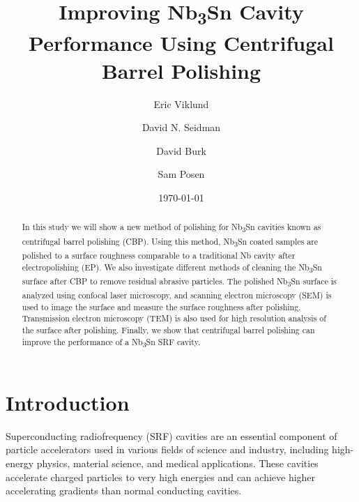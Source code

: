\documentclass[reprint,amsmath,amssymb,aps]{revtex4-2}%
\begin{document}
%
\normalsize%
\title{Improving Nb\textsubscript{3}Sn Cavity Performance Using Centrifugal Barrel Polishing}%
\author{Eric Viklund}%
%
%
\author{David N. Seidman}%
%
\author{David Burk}%
%
\author{Sam Posen}%
%
\date{\today}%

\begin{abstract}%
In this study we will show a new method of polishing for Nb\textsubscript{3}Sn cavities known as centrifugal barrel polishing (CBP). Using this method, Nb\textsubscript{3}Sn coated samples are polished to a surface roughness comparable to a traditional Nb cavity after electropolishing (EP). We also investigate different methods of cleaning the Nb\textsubscript{3}Sn surface after CBP to remove residual abrasive particles. The polished Nb\textsubscript{3}Sn surface is analyzed using confocal laser microscopy, and scanning electron microscopy (SEM) is used to image the surface and measure the surface roughness after polishing. Transmission electron microscopy (TEM) is also used for high resolution analysis of the surface after polishing. Finally, we show that centrifugal barrel polishing can improve the performance of a Nb\textsubscript{3}Sn SRF cavity.
%
\end{abstract}%

\maketitle%

\section{Introduction}%
\label{sec:Introduction}%
Superconducting radiofrequency (SRF) cavities are an essential component of particle accelerators used in various fields of science and industry, including high-energy physics, material science, and medical applications. These cavities accelerate charged particles to very high energies and can achieve higher accelerating gradients than normal conducting cavities.
\end{document}
